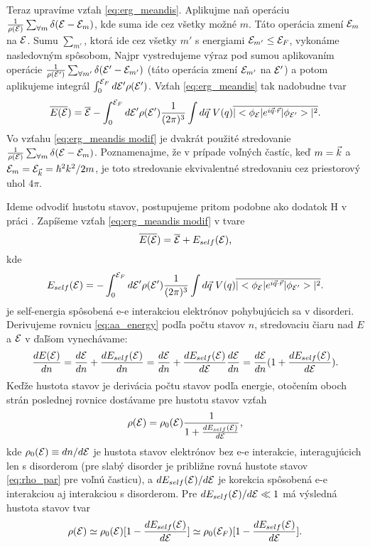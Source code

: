Teraz upravíme vzťah \eqref{eq:erg_meandis}. Aplikujme naň operáciu $\frac{1}{\rho(\mathcal{E})}\sum_{\forall m} \delta(\mathcal{E}-\mathcal{E}_{m})$, kde suma ide cez všetky možné $m$. Táto operácia
zmení $\mathcal{E}_{m}$ na $\mathcal{E}$. Sumu $\sum_{m'}$, ktorá ide cez všetky $m'$ s energiami $\mathcal{E}_{m'} \leq \mathcal{E}_{F}$, vykonáme nasledovným spôsobom,
Najpr vystredujeme výraz pod sumou aplikovaním operácie $\frac{1}{\rho(\mathcal{E}')}\sum_{\forall m'} \delta(\mathcal{E}'-\mathcal{E}_{m'})$ (táto operácia zmení $\mathcal{E}_{m'}$ na $\mathcal{E}'$) a potom
aplikujeme integrál  $\int_{0}^{\mathcal{E}_F} d\mathcal{E}' \rho(\mathcal{E}')$.
Vzťah \eqref{eq:erg_meandis} tak nadobudne tvar
\begin{equation}
\label{eq:erg_meandis modif}
 \overline{E(\mathcal{E}})=\overline{\mathcal{E}}-\int_{0}^{\mathcal{E}_F} d\mathcal{E}' \rho(\mathcal{E}') \frac{1}{(2\pi)^{3}} \int d\vec{q}\ V(q) \overline{|<\phi_{\mathcal{E}}|e^{i\vec{q}\cdot\vec{r}}|\phi_{\mathcal{E}'}>|^2} \text{.}
\end{equation}
Vo vzťahu \eqref{eq:erg_meandis modif} je dvakrát použité stredovanie $\frac{1}{\rho(\mathcal{E})}\sum_{\forall m} \delta(\mathcal{E}-\mathcal{E}_{m})$. Poznamenajme, že v prípade voľných častíc, keď $m = \vec{k}$ a $\mathcal{E}_{m} = \mathcal{E}_{\vec{k}} = \hbar^2k^2/2m$, je toto stredovanie ekvivalentné stredovaniu cez priestorový uhol $4 \pi$.

Ideme odvodiť hustotu stavov, postupujeme pritom podobne ako dodatok H v práci \cite{Imry}. Zapíšeme vzťah \eqref{eq:erg_meandis modif} v tvare
\begin{equation}
 \label{eq:aa_energy}
 \overline{E(\mathcal{E}})=\overline{\mathcal{E}}+E_{self}(\mathcal{E})\text{,}
\end{equation}
kde
\begin{equation}
 \label{eq:aa_self_energy vseobec}
 E_{self}(\mathcal{E})=-\int_{0}^{\mathcal{E}_F} d\mathcal{E}' \rho(\mathcal{E}') \frac{1}{(2\pi)^{3}} \int d\vec{q}\ V(q) \overline{|<\phi_{\mathcal{E}}|e^{i\vec{q}\cdot\vec{r}}|\phi_{\mathcal{E}'}>|^2} \text{.}
\end{equation}
je self-energia spôsobená e-e interakciou elektrónov pohybujúcich sa v disorderi.
Derivujeme rovnicu \eqref{eq:aa_energy} podľa počtu stavov $n$, stredovaciu čiaru nad $E$ a $\mathcal{E}$ v ďaľšom vynechávame:
\begin{equation}
  \frac{d E(\mathcal{E})}{dn}=\frac{d\mathcal{E}}{dn}+\frac{dE_{self}(\mathcal{E})}{dn}=\frac{d\mathcal{E}}{dn}+\frac{dE_{self}(\mathcal{E})}{d\mathcal{E}}\frac{d\mathcal{E}}{dn}=\frac{d\mathcal{E}}{dn}(1+\frac{dE_{self}(\mathcal{E})}{d\mathcal{E}}) \text{.}
\end{equation}
Keďže hustota stavov je derivácia počtu stavov podľa energie, otočením oboch strán poslednej rovnice dostávame pre hustotu stavov vzťah
\begin{equation}
 \label{eq:aa_dos1}
 \rho(\mathcal{E})=\rho_0(\mathcal{E})\frac{1}{1+\frac{dE_{self}(\mathcal{E})}{d\mathcal{E}}} \text{,}
 \end{equation}
 kde $\rho_0(\mathcal{E}) \equiv dn/d\mathcal{E}$ je hustota stavov elektrónov bez e-e interakcie, interagujúcich len s disorderom (pre slabý disorder je približne rovná hustote stavov \eqref{eq:rho_par} pre voľnú časticu), a
 $dE_{self}(\mathcal{E})/d\mathcal{E}$ je korekcia spôsobená e-e interakciou aj interakciou s disorderom.
 Pre $dE_{self}(\mathcal{E})/d\mathcal{E} \ll 1$  má výsledná hustota stavov tvar
\begin{equation}
 \label{eq:aa_dos2}
 \rho(\mathcal{E}) \simeq \rho_0(\mathcal{E})[1-\frac{dE_{self}(\mathcal{E})}{d\mathcal{E}}] \simeq \rho_0(\mathcal{E}_F)[1-\frac{dE_{self}(\mathcal{E})}{d\mathcal{E}}] \text{.}
\end{equation}

